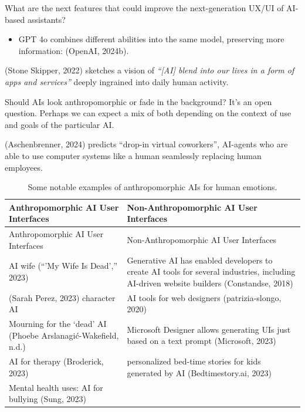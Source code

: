 \documentclass[
  letterpaper,
  DIV=11,
  numbers=noendperiod]{scrartcl}
\providecommand{\tightlist}{%
  \setlength{\itemsep}{0pt}\setlength{\parskip}{0pt}}\usepackage{longtable,booktabs,array}
\begin{document}
What are the next features that could improve the next-generation UX/UI
of AI-based assistants?

\begin{itemize}
\tightlist
\item
  GPT 4o combines different abilities into the same model, preserving
  more information: (OpenAI, 2024b).
\end{itemize}

(Stone Skipper, 2022) sketches a vision of \emph{``{[}AI{]} blend into
our lives in a form of apps and services''} deeply ingrained into daily
human activity.

Should AIs look anthropomorphic or fade in the background? It's an open
question. Perhaps we can expect a mix of both depending on the context
of use and goals of the particular AI.

(Aschenbrenner, 2024) predicts ``drop-in virtual coworkers'', AI-agents
who are able to use computer systems like a human seamlessly replacing
human employees.

\begin{longtable}[]{@{}
  >{\raggedright\arraybackslash}p{}
  >{\raggedright\arraybackslash}p{}@{}}
\caption{Some notable examples of anthropomorphic AIs for human
emotions.}\tabularnewline
\toprule\noalign{}
\begin{minipage}[b]{\linewidth}\raggedright
Anthropomorphic AI User Interfaces
\end{minipage} & \begin{minipage}[b]{\linewidth}\raggedright
Non-Anthropomorphic AI User Interfaces
\end{minipage} \\
\midrule\noalign{}
\endfirsthead
\toprule\noalign{}
\begin{minipage}[b]{\linewidth}\raggedright
Anthropomorphic AI User Interfaces
\end{minipage} & \begin{minipage}[b]{\linewidth}\raggedright
Non-Anthropomorphic AI User Interfaces
\end{minipage} \\
\midrule\noalign{}
\endhead
\bottomrule\noalign{}
\endlastfoot
AI wife ({``'{My} Wife Is Dead',''} 2023) & Generative AI has enabled
developers to create AI tools for several industries, including
AI-driven website builders (Constandse, 2018) \\
(Sarah Perez, 2023) character AI & AI tools for web designers
(patrizia-slongo, 2020) \\
Mourning for the `dead' AI (Phoebe Arslanagić-Wakefield, n.d.) &
Microsoft Designer allows generating UIs just based on a text prompt
(Microsoft, 2023) \\
AI for therapy (Broderick, 2023) & personalized bed-time stories for
kids generated by AI (Bedtimestory.ai, 2023) \\
Mental health uses: AI for bullying (Sung, 2023) & \\
\end{longtable}
\end{document}
